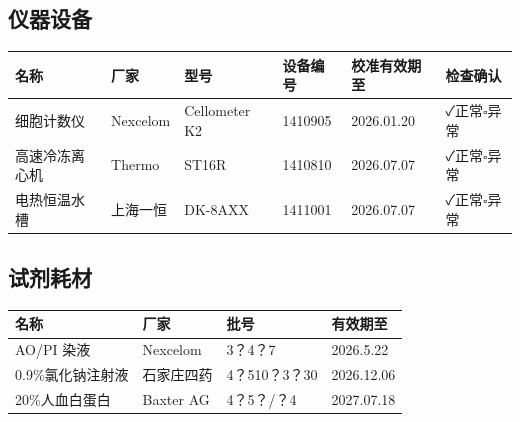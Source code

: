 \documentclass[UTF8,10pt,a4paper,fontset=fandol]{ctexart}
\newcommand{\fieldvalue}[1]{#1}
\newcommand{\handwritten}[1]{#1}
\begin{document}
\subsection{仪器设备}

\begin{tabularx}{\textwidth}{|l|l|l|l|X|l|}
\hline
名称 & 厂家 & 型号 & 设备编号 & 校准有效期至 & 检查确认\\
\hline
细胞计数仪 & Nexcelom & Cellometer K2 & 1410905 &
\fieldvalue{\handwritten{2026.01.20}} &
\fieldvalue{\handwritten{✓}}正常\quad $\square$异常\\
\hline
高速冷冻离心机 & Thermo & ST16R & 1410810 &
\fieldvalue{\handwritten{2026.07.07}} &
\fieldvalue{\handwritten{✓}}正常\quad $\square$异常\\
\hline
电热恒温水槽 & 上海一恒 & DK-8AXX & 1411001 &
\fieldvalue{\handwritten{2026.07.07}} &
\fieldvalue{\handwritten{✓}}正常\quad $\square$异常\\
\hline
\end{tabularx}

\subsection{试剂耗材}

\begin{tabularx}{\textwidth}{|l|l|X|X|}
\hline
名称 & 厂家 & 批号 & 有效期至\\
\hline
AO/PI 染液 & Nexcelom &
\fieldvalue{\handwritten{3？4？7}} &
\fieldvalue{\handwritten{2026.5.22}}\\
\hline
0.9\%氯化钠注射液 & 石家庄四药 &
\fieldvalue{\handwritten{4？510？3？30}} &
\fieldvalue{\handwritten{2026.12.06}}\\
\hline
20\%人血白蛋白 & Baxter AG &
\fieldvalue{\handwritten{4？5？/？4}} &
\fieldvalue{\handwritten{2027.07.18}}\\
\hline
\end{tabularx}
\end{document}
